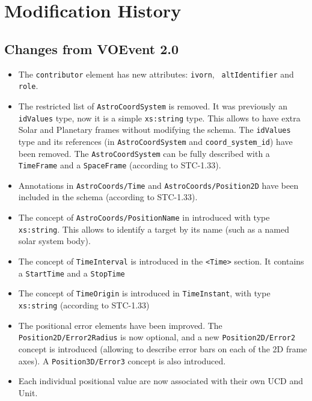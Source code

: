 \documentclass[11pt,a4paper]{ivoa}
\begin{document}



\appendix

\section{Modification History}
\subsection{Changes from VOEvent 2.0}
\label{appendix:last-changes}
\begin{itemize}
\item The {\tt contributor} element has new attributes: {\tt ivorn}, {\tt 
altIdentifier} and {\tt role}. 
\item The restricted list of {\tt AstroCoordSystem} is removed. It was 
previously an {\tt idValues} type, now it is a simple {\tt xs:string} type. 
This allows to have extra Solar and Planetary frames without modifying the 
schema. The {\tt idValues} type and its references (in {\tt AstroCoordSystem} 
and {\tt coord\_system\_id}) have been removed. The {\tt AstroCoordSystem} can 
be fully described with a {\tt TimeFrame} and a {\tt SpaceFrame}  (according to 
STC-1.33).
\item Annotations in {\tt AstroCoords/Time} and {\tt AstroCoords/Position2D} 
have been included in the schema (according to STC-1.33).
\item The concept of {\tt AstroCoords/PositionName} in introduced with type {\tt
xs:string}. This allows to identify a target by its name (such as a named solar
system body). 
\item The concept of {\tt TimeInterval} is introduced in the {\tt <Time>} 
section. It contains a {\tt StartTime} and a {\tt StopTime}
\item The concept of {\tt TimeOrigin} is introduced in {\tt TimeInstant}, with 
type {\tt xs:string} (according to STC-1.33)
\item The positional error elements have been improved. The {\tt 
Position2D/Error2Radius} is now optional, and a new {\tt Position2D/Error2} 
concept is introduced (allowing to describe error bars on each of the 2D frame 
axes). A {\tt Position3D/Error3} concept is also introduced.
\item Each individual positional value are now associated with their own UCD 
and Unit. 
\end{itemize}
\end{document}
